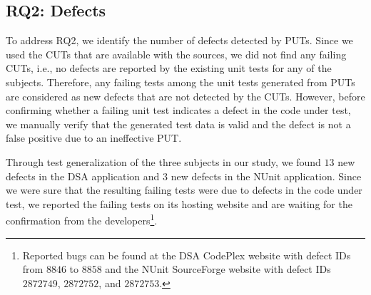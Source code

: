 \subsection{RQ2: Defects}

To address RQ2, we identify the number of defects detected by PUTs. Since we used the CUTs that are available with the sources, we did not find any failing CUTs, i.e., no defects are reported by the existing unit tests for any of the subjects. Therefore, any failing tests among the unit tests generated from PUTs are considered as new defects that are not detected by the CUTs. However, before confirming whether a failing unit test indicates a defect in the code under test, we manually verify that the generated test data is valid and the defect is not a false positive due to an ineffective PUT. 

Through test generalization of the three subjects in our study, we found $13$ new defects in the DSA application and $3$ new defects in the NUnit application. Since we were sure that the resulting failing tests were due to defects in the code under test, we reported the failing tests on its hosting website and are waiting for the confirmation from the developers\footnote{Reported bugs can be found at the DSA CodePlex website with defect IDs from $8846$ to $8858$ and the NUnit SourceForge website with defect IDs $2872749$, $2872752$, and $2872753$.}.

